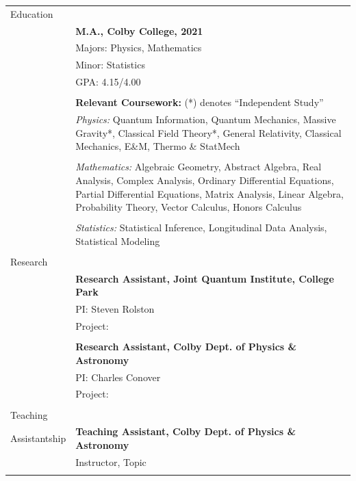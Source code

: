 \documentclass[10pt]{article}
\begin{document}
\noindent \begin{longtable}{ l m{13.5cm}   }

	
	
  \large{Education}    	& \\ 
  						& \textbf{M.A., Colby College, 2021} \\
     				 	& Majors: Physics, Mathematics \\
     				 	& Minor: Statistics  \\
     					& GPA: 4.15/4.00 \\
	 					& \\
	 					& \textbf{Relevant Coursework:} (*) denotes ``Independent Study'' \\
	 					& \textit{Physics:} Quantum Information, Quantum Mechanics, Massive Gravity*, Classical Field Theory*,  General Relativity, Classical Mechanics, E\&M, Thermo \& StatMech\\  \vspace{-7pt}
	 					& \\
	 					& \textit{Mathematics:} Algebraic Geometry, Abstract Algebra, Real Analysis, Complex Analysis, Ordinary Differential Equations, Partial Differential Equations, Matrix Analysis, Linear Algebra, Probability Theory, Vector Calculus, Honors Calculus\\   \vspace{-7pt}
	 					& \\ 
	 					& \textit{Statistics:} Statistical Inference, Longitudinal Data Analysis, Statistical Modeling\\
	 					& \\
    
        
  \large{Research}      & \\  
  						& \textbf{Research Assistant, Joint Quantum Institute, College Park}  \\
     					& PI: Steven Rolston \\
     					& Project:  \\
     					& \\
     					 
     					& \textbf{Research Assistant, Colby Dept. of Physics \& Astronomy}\\
     					& PI: Charles Conover \\
     					& Project:  \\
     					& \\
     					   					 
     					 
     					 
  \large{Teaching}   	& \\ 
  \large{Assistantship} & \textbf{Teaching Assistant, Colby Dept. of Physics \& Astronomy} \\
    					& Instructor, Topic \\
     					& \\
     					 

\end{longtable}
\end{document}

